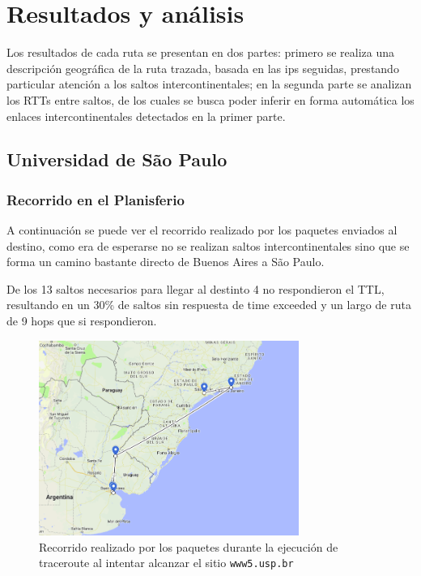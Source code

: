 \section{Resultados y análisis}

Los resultados de cada ruta se presentan en dos partes: primero se realiza una descripción geográfica de la ruta trazada, basada en las ips seguidas, prestando particular atención a los saltos intercontinentales; en la segunda parte se analizan los RTTs entre saltos, de los cuales se busca poder inferir en forma automática los enlaces intercontinentales detectados en la primer parte.

\subsection*{Universidad de São Paulo}

\subsubsection*{Recorrido en el Planisferio}

A continuación se puede ver el recorrido realizado por los paquetes enviados al destino, como era de esperarse no se realizan saltos intercontinentales sino que se forma un camino bastante directo de Buenos Aires a São Paulo.

De los 13 saltos necesarios para llegar al destinto 4 no respondieron el TTL, resultando en un 30\% de saltos sin respuesta de time exceeded y un largo de ruta de 9 hops que si respondieron.

\begin{figure}[H]
  \centering
  \includegraphics[width=8.5cm]{figs/saopaulo.png}
  \caption{\footnotesize Recorrido realizado por los paquetes durante la ejecución de traceroute al intentar alcanzar el sitio \texttt{www5.usp.br}}
\end{figure}

